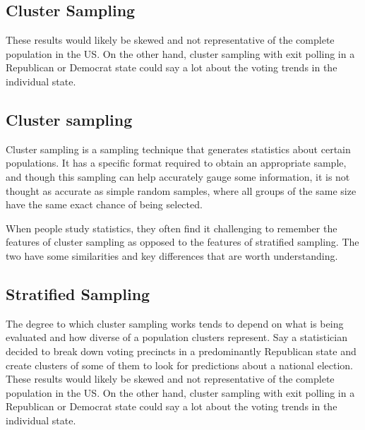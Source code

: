 ﻿\documentclass[]{report}
\begin{document}

\subsection{Cluster Sampling}

These results would likely be skewed and not representative of the complete population in the US. On the other hand, cluster sampling with exit polling in a Republican or Democrat state could say a lot about the voting trends in the individual state. 





\subsection{Cluster sampling }
Cluster sampling is a sampling technique that generates statistics about certain populations. It has a specific format required to obtain an appropriate sample, and though this sampling can help accurately gauge some information, it is not thought as accurate as simple random samples, where all groups of the same size have the same exact chance of being selected. 


When people study statistics, they often find it challenging to remember the features of cluster sampling as opposed to the features of stratified sampling. The two have some similarities and key differences that are worth understanding.


\subsection{Stratified Sampling}
The degree to which cluster sampling works tends to depend on what is being evaluated and how diverse of a population clusters represent. Say a statistician decided to break down voting precincts in a predominantly Republican state and create clusters of some of them to look for predictions about a national election. These results would likely be skewed and not representative of the complete population in the US. On the other hand, cluster sampling with exit polling in a Republican or Democrat state could say a lot about the voting trends in the individual state.
\end{document}
